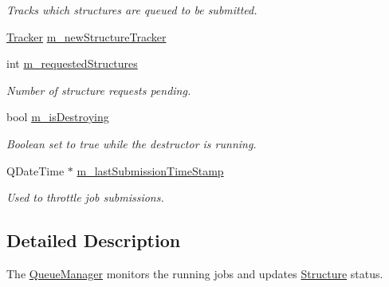 \begin{DoxyCompactItemize}
\begin{DoxyCompactList}\small\item\em Tracks which structures are queued to be submitted. \end{DoxyCompactList}\item 
\hyperlink{classGlobalSearch_1_1Tracker}{Tracker} \hyperlink{classGlobalSearch_1_1QueueManager_ab93522c4a198ea3401baf662b00a7ec7}{m\-\_\-new\-Structure\-Tracker}
\item 
\hypertarget{classGlobalSearch_1_1QueueManager_ae8f5365d11d9db4bb8607a909b843cce}{int \hyperlink{classGlobalSearch_1_1QueueManager_ae8f5365d11d9db4bb8607a909b843cce}{m\-\_\-requested\-Structures}}\label{classGlobalSearch_1_1QueueManager_ae8f5365d11d9db4bb8607a909b843cce}

\begin{DoxyCompactList}\small\item\em Number of structure requests pending. \end{DoxyCompactList}\item 
\hypertarget{classGlobalSearch_1_1QueueManager_a33201e78793ede9a0b2bc233e180664c}{bool \hyperlink{classGlobalSearch_1_1QueueManager_a33201e78793ede9a0b2bc233e180664c}{m\-\_\-is\-Destroying}}\label{classGlobalSearch_1_1QueueManager_a33201e78793ede9a0b2bc233e180664c}

\begin{DoxyCompactList}\small\item\em Boolean set to true while the destructor is running. \end{DoxyCompactList}\item 
\hypertarget{classGlobalSearch_1_1QueueManager_a94ba4286ec00cec9516ef9766e4d76a1}{Q\-Date\-Time $\ast$ \hyperlink{classGlobalSearch_1_1QueueManager_a94ba4286ec00cec9516ef9766e4d76a1}{m\-\_\-last\-Submission\-Time\-Stamp}}\label{classGlobalSearch_1_1QueueManager_a94ba4286ec00cec9516ef9766e4d76a1}

\begin{DoxyCompactList}\small\item\em Used to throttle job submissions. \end{DoxyCompactList}\end{DoxyCompactItemize}


\subsection{Detailed Description}
The \hyperlink{classGlobalSearch_1_1QueueManager}{Queue\-Manager} monitors the running jobs and updates \hyperlink{classGlobalSearch_1_1Structure}{Structure} status. 

